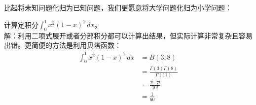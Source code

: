 比起将未知问题化归为已知问题，我们更愿意将大学问题化归为小学问题：
\begin{example}[贝塔函数的使用]
    计算定积分$\int_{0}^{1}x^2(1-x)^7\,dx$。\\
    解：利用二项式展开或者分部积分都可以计算出结果，但实际计算非常复杂且容易出错。更简便的方法是利用贝塔函数：\begin{align*}
        \int_{0}^{1}x^2(1-x)^7\,dx&=B(3,8)\\
                                 &=\frac{\Gamma (3)\Gamma (8)}{\Gamma (11)}\\
                                 &=\frac{2! \cdot 7!}{10!}\\
                                 &=\frac{1}{60}
    \end{align*}
\end{example}

